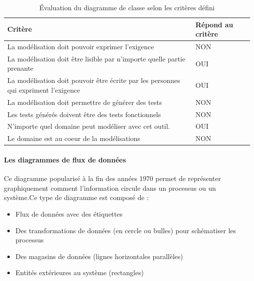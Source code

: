         \begin{table}[H]
        \centering
         \begin{tabular}{|p{25em}|p{5em}|} 
         \hline
        Critère & Répond au critère \\ [0.5ex] 
         \hline
         La modélisation doit pouvoir exprimer l’exigence & \cellcolor[HTML]{D03737}NON\\
         \hline
        La modélisation doit être lisible par n’importe quelle partie prenante & \cellcolor[HTML]{699A73}OUI\\
         \hline
        La modélisation doit pouvoir être écrite par les personnes qui expriment l’exigence &\cellcolor[HTML]{699A73} OUI \\
         \hline
        La modélisation doit permettre de générer des tests & \cellcolor[HTML]{D03737}NON \\
         \hline
        Les tests générés doivent être des tests fonctionnels &\cellcolor[HTML]{D03737} NON\\ 
         \hline
        N’importe quel domaine peut modéliser avec cet outil.&\cellcolor[HTML]{699A73} OUI\\ 
         \hline
        Le domaine est au coeur de la modélisations &\cellcolor[HTML]{D03737} NON\\ 
        \hline 
        \end{tabular}
        \caption{Évaluation du diagramme de classe selon les critères défini}
        \end{table}

        \paragraph{Les diagrammes de flux de données}

        Ce diagramme popularisé à la fin des années 1970 permet de représenter graphiquement comment l'information circule dans un processus ou un système.Ce type de diagramme est composé de :
         \begin{itemize}
            \item Flux de données avec des étiquettes 
            \item Des transformations de données (en cercle ou bulles) pour schématiser les processus
            \item Des magasins de données (lignes horizontales parallèles)
            \item Entités extérieures au système (rectangles)
        \end{itemize}

